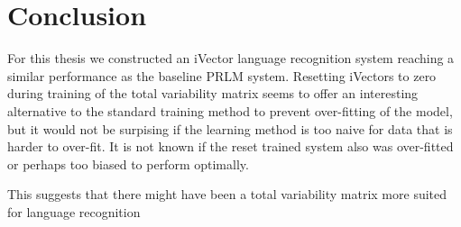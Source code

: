 \chapter{Conclusion}

For this thesis we constructed an iVector language recognition system reaching a similar performance as the baseline PRLM system. Resetting iVectors to zero during training of the total variability matrix seems to offer an interesting alternative to the standard training method to prevent over-fitting of the model, but it would not be surpising if the learning method is too naive for data that is harder to over-fit. It is not known if the reset trained system also was over-fitted or perhaps too biased to perform optimally. 


This suggests that there might have been a total variability matrix more suited for language recognition












